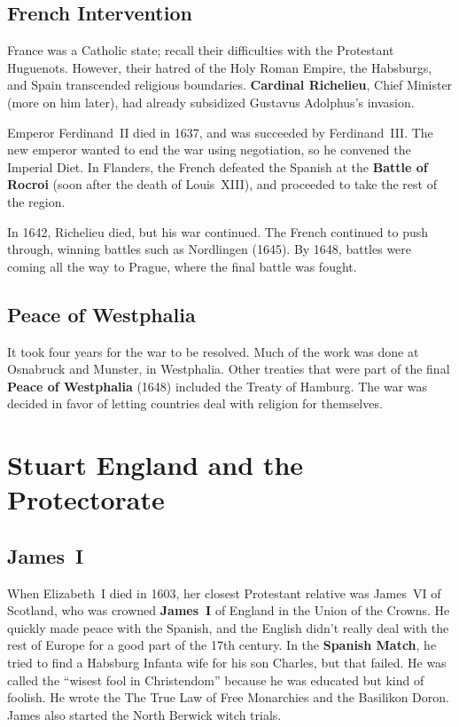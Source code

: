 \subsection*{French Intervention}

France was a Catholic state; recall their difficulties with the Protestant Huguenots.
However, their hatred of the Holy Roman Empire, the Habsburgs, and Spain transcended religious boundaries.
\textbf{Cardinal Richelieu}, Chief Minister (more on him later),
had already subsidized Gustavus Adolphus's invasion.

Emperor Ferdinand~II died in 1637, and was succeeded by Ferdinand~III\@.
The new emperor wanted to end the war using negotiation, so he convened the Imperial Diet.
In Flanders,
the French defeated the Spanish at the \textbf{Battle of Rocroi} (soon after the death of Louis~XIII),
and proceeded to take the rest of the region.

In 1642, Richelieu died, but his war continued.
The French continued to push through, winning battles such as Nordlingen (1645).
By 1648, battles were coming all the way to Prague, where the final battle was fought.

\subsection*{Peace of Westphalia}

It took four years for the war to be resolved.
Much of the work was done at Osnabruck and Munster, in Westphalia.
Other treaties that were part of the final \textbf{Peace of Westphalia} (1648) included the Treaty of Hamburg.
The war was decided in favor of letting countries deal with religion for themselves.

\section{Stuart England and the Protectorate}

\subsection*{James~I}

When Elizabeth~I died in 1603, her closest Protestant relative was
James~VI of Scotland, who was crowned \textbf{James~I} of England in the Union of the Crowns.
He quickly made peace with the Spanish,
and the English didn't really deal with the rest of Europe for a good part of the 17th century.
In the \textbf{Spanish Match}, he tried to find a Habsburg Infanta wife for his son Charles, but that failed.
He was called the ``wisest fool in Christendom'' because he was educated but kind of foolish.
He wrote the The True Law of Free Monarchies and the Basilikon Doron.
James also started the North Berwick witch trials.

